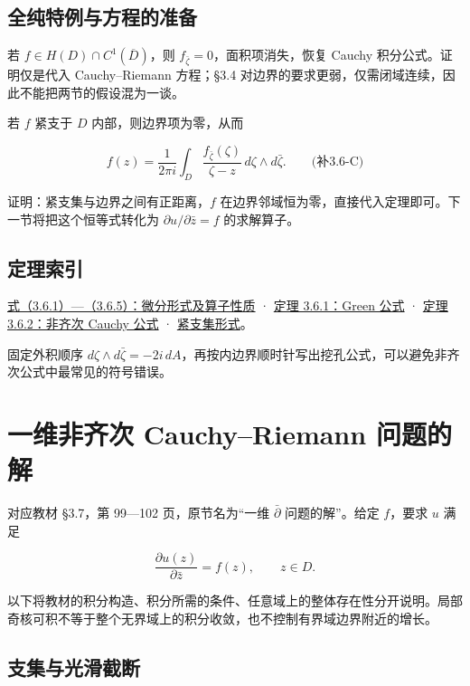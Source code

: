 \documentclass[11pt,a4paper]{article}
\begin{document}
\subsection{全纯特例与方程的准备}\label{ch03-s6-ux5168ux7eafux7279ux4f8bux4e0eux65b9ux7a0bux7684ux51c6ux5907}

若 \(f\in H(D)\cap C^1(\overline D)\)，则
\(f_{\bar\zeta}=0\)，面积项消失，恢复 Cauchy 积分公式。证明仅是代入
Cauchy--Riemann 方程；§3.4
对边界的要求更弱，仅需闭域连续，因此不能把两节的假设混为一谈。

若 \(f\) 紧支于 \(D\) 内部，则边界项为零，从而

\[
f(z)=\frac1{2\pi i}\int_D\frac{f_{\bar\zeta}(\zeta)}{\zeta-z}\,d\zeta\wedge d\bar\zeta.
\qquad\text{(补3.6-C)}
\]

证明：紧支集与边界之间有正距离，\(f\)
在边界邻域恒为零，直接代入定理即可。下一节将把这个恒等式转化为
\(\partial u/\partial\bar z=f\) 的求解算子。

\subsection{定理索引}\label{ch03-s6-ux5b9aux7406ux7d22ux5f15}

\hyperref[ch03-s6-ux590dux5faeux5206ux5f62ux5f0fux4e0eux5916ux79ef]{式（3.6.1）---（3.6.5）：微分形式及算子性质}
· \hyperref[ch03-s6-ux590dux5f62ux5f0fux7684-green-ux516cux5f0f]{定理
3.6.1：Green 公式} ·
\hyperref[ch03-s6-ux975eux9f50ux6b21-cauchy-ux516cux5f0f]{定理 3.6.2：非齐次
Cauchy 公式} ·
\hyperref[ch03-s6-ux5168ux7eafux7279ux4f8bux4e0eux65b9ux7a0bux7684ux51c6ux5907]{紧支集形式}。

固定外积顺序
\(d\zeta\wedge d\bar\zeta=-2i\,dA\)，再按内边界顺时针写出挖孔公式，可以避免非齐次公式中最常见的符号错误。

\section{一维非齐次 Cauchy–Riemann 问题的解}
对应教材 §3.7，第 99---102 页，原节名为``一维 \(\bar\partial\)
问题的解''。给定 \(f\)，要求 \(u\) 满足

\[
\frac{\partial u(z)}{\partial\bar z}=f(z),\qquad z\in D.
\]

以下将教材的积分构造、积分所需的条件、任意域上的整体存在性分开说明。局部奇核可积不等于整个无界域上的积分收敛，也不控制有界域边界附近的增长。

\subsection{支集与光滑截断}\label{ch03-s7-ux652fux96c6ux4e0eux5149ux6ed1ux622aux65ad}
\end{document}
